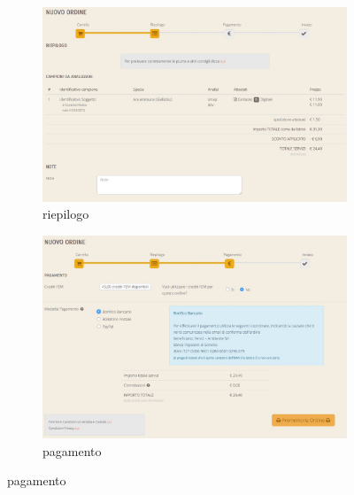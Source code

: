 \begin{figure}
\begin{subfigure}[b]{0.33\textwidth}
   \includegraphics[width=\textwidth]{images/cl-nuovo-ordine-riepilogo} 
   \caption{riepilogo}
   \label{fig:cl-nuovo-ordine-riepilogo}
 \end{subfigure}
 \begin{subfigure}[b]{0.33\textwidth}
   \includegraphics[width=\textwidth]{images/cl-nuovo-ordine-pagamento}
   \caption{pagamento}
   \label{fig:cl-nuovo-ordine-pagamento} 
 \end{subfigure}
 

\end{figure}
